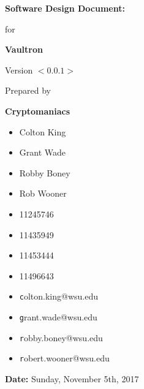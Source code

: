 \documentclass[11pt]{report}
\begin{document}

{\Huge \textbf{Software Design Document:}}
\vspace{5mm}
\begin{flushright}

    {\huge for}
    \vspace{20mm}

    \textbf{\Huge Vaultron}
    \vspace{20mm}

    {\huge Version $<0.0.1>$}
    \vspace{20mm}

    {\huge Prepared by}
    \vspace{20mm}

    \textbf{\huge Cryptomaniacs}
    \vspace{20mm}
\end{flushright}

\begin{multicols}{3}
    \noindent
    \begin{itemize}
        \item[] {\large Colton King}
        \item[] {\large Grant Wade}
        \item[] {\large Robby Boney}
        \item[] {\large Rob Wooner}
    \end{itemize}

    \begin{itemize}
        \item[] {\large 11245746}
        \item[] {\large 11435949}
        \item[] {\large 11453444}
        \item[] {\large 11496643}
    \end{itemize}

    \begin{itemize}
        \item[] {\large\texttt colton.king@wsu.edu}
        \item[] {\large\texttt grant.wade@wsu.edu}
        \item[] {\large\texttt robby.boney@wsu.edu}
        \item[] {\large\texttt robert.wooner@wsu.edu}
    \end{itemize}
\end{multicols}

\vfill

\begin{flushright}
    \vspace{20mm}
    {\Large \textbf{Date:} Sunday, November 5th, 2017}
\end{flushright}
\end{document}

